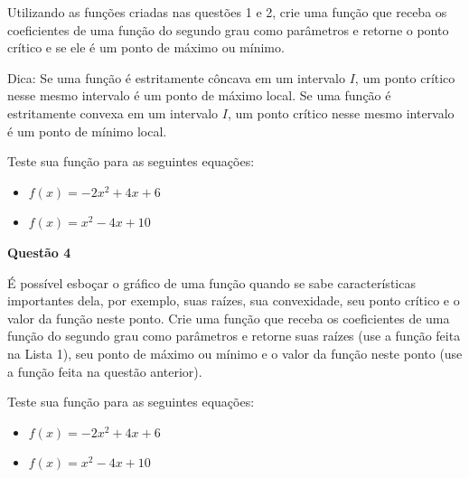 \documentclass[12pt, a4paper]{article}
\begin{document}
Utilizando as funções criadas nas questões 1 e 2, crie uma função que receba os coeficientes de uma função do segundo grau como parâmetros e retorne o ponto crítico e se ele é um ponto de máximo ou mínimo. 

Dica: Se uma função é estritamente côncava em um intervalo $I$, um ponto crítico nesse mesmo intervalo é um ponto de máximo local. Se uma função é estritamente convexa em um intervalo $I$, um ponto crítico nesse mesmo intervalo é um ponto de mínimo local.

Teste sua função para as seguintes equações:

\begin{itemize}
	\item $f(x) = -2x^2 + 4x + 6$
	\item $f(x) = x^2 - 4x + 10$
\end{itemize}



\textbf{Questão 4}

É possível esboçar o gráfico de uma função quando se sabe características importantes dela, por exemplo, suas raízes, sua convexidade, seu ponto crítico e o valor da função neste ponto. Crie uma função que receba os coeficientes de uma função do segundo grau como parâmetros e retorne suas raízes (use a função feita na Lista 1), seu ponto de máximo ou mínimo e o valor da função neste ponto (use a função feita na questão anterior).

Teste sua função para as seguintes equações:

\begin{itemize}
	\item $f(x) = -2x^2 + 4x + 6$
	\item $f(x) = x^2 - 4x + 10$
\end{itemize}


	
\end{document}
